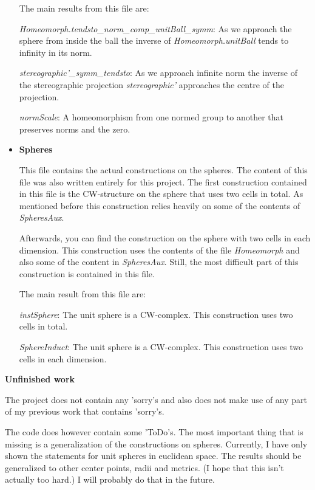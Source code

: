 \documentclass[11pt,a4paper]{article}
\begin{document}
\begin{itemize}
The main results from this file are: 

\emph{Homeomorph.tendsto\_norm\_comp\_unitBall\_symm}: As we approach the sphere from inside the ball the
inverse of \emph{Homeomorph.unitBall} tends to infinity in its norm.

\emph{stereographic'\_symm\_tendsto}: As we approach infinite norm the inverse of the stereographic
projection \emph{stereographic'} approaches the centre of the projection.

\emph{normScale}: A homeomorphism from one normed group to another that preserves norms and the zero.

    \item \textbf{Spheres}

This file contains the actual constructions on the spheres. 
The content of this file was also written entirely for this project. 
The first construction contained in this file is the CW-structure on the sphere that uses two cells in 
total. 
As mentioned before this construction relies heavily on some of the contents of \emph{SpheresAux}. 

Afterwards, you can find the construction on the sphere with two cells in each dimension. 
This construction uses the contents of the file \emph{Homeomorph} and also some of the content in 
\emph{SpheresAux}. 
Still, the most difficult part of this construction is contained in this file. 

The main result from this file are: 

\emph{instSphere}: The unit sphere is a CW-complex. This construction uses two cells in total.

\emph{SphereInduct}: The unit sphere is a CW-complex. This construction uses two cells in each
dimension.

\end{itemize}

\bigskip

{\bf Unfinished work}

\medskip

The project does not contain any 'sorry's and also does not make use of any part of my previous work 
that contains 'sorry's. 

The code does however contain some 'ToDo's. 
The most important thing that is missing is a generalization of the constructions on spheres. 
Currently, I have only shown the statements for unit spheres in euclidean space. 
The results should be generalized to other center points, radii and metrics. 
(I hope that this isn't actually too hard.)
I will probably do that in the future. 
\end{document}
